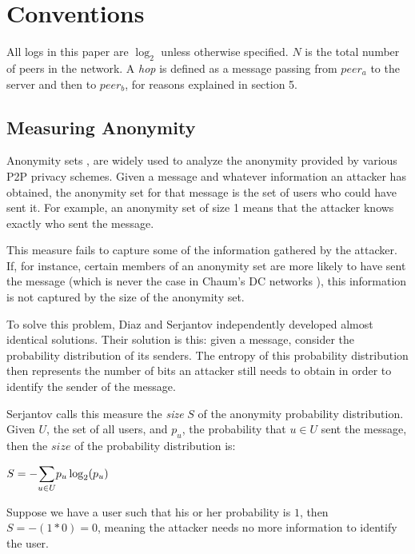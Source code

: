 \documentclass[twocolumn,11pt,english]{article}
\begin{document}
\section{Conventions}
All logs in this paper are $\log_2$ unless otherwise specified. $N$ is the total number of peers in the network. A \textit{hop} is defined as a message passing from $peer_a$ to the server and then to $peer_b$, for reasons explained in section 5.

\subsection{Measuring Anonymity}
Anonymity sets \cite{chaum-dc}, are widely used to analyze the anonymity provided by various P2P privacy schemes. Given a message and whatever information an attacker has obtained, the anonymity set for that message is the set of users who could have sent it. For example, an anonymity set of size 1 means that the attacker knows exactly who sent the message.

This measure fails to capture some of the information gathered by the attacker. If, for instance, certain members of an anonymity set are more likely to have sent the message (which is never the case in Chaum's DC networks \cite{chaum-dc}), this information is not captured by the size of the anonymity set. 

To solve this problem, Diaz \cite{Diaz02} and Serjantov \cite{Serj02} independently developed almost identical solutions. Their solution is this: given a message, consider the probability distribution of its senders. The entropy of this probability distribution then represents the number of bits an attacker still needs to obtain in order to identify the sender of the message. 

Serjantov \cite{Serj02} calls this measure the \textit{size} $S$ of the anonymity probability distribution. Given $U$, the set of all users, and $p_u$, the probability that $u \in U$ sent the message, then the $size$ of the probability distribution is:

\begin{center}
  $ S = - \mathlarger{\sum}\limits_{u \in U} p_u \log_2(p_u)$
\end{center}

Suppose we have a user such that his or her probability is $1$, then  $S = -(1 * 0) = 0$, meaning the attacker needs no more information to identify the user. 
\end{document}
